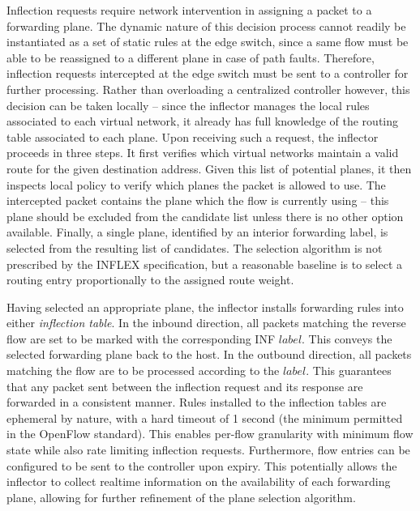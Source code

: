 Inflection requests require network intervention in assigning a packet to a forwarding plane.
The dynamic nature of this decision process cannot readily be instantiated as a set of static rules at the edge switch, since a same flow must be able to be reassigned to a different plane in case of path faults.
Therefore, inflection requests intercepted at the edge switch must be sent to a controller for further processing.
Rather than overloading a centralized controller however, this decision can be taken locally -- since the inflector manages the local rules associated to each virtual network, it already has full knowledge of the routing table associated to each plane.
Upon receiving such a request, the inflector proceeds in three steps.
It first verifies which virtual networks maintain a valid route for the given destination address.
Given this list of potential planes, it then inspects local policy to verify which planes the packet is allowed to use.
The intercepted packet contains the plane which the flow is currently using -- this plane should be excluded from the candidate list unless there is no other option available.
Finally, a single plane, identified by an interior forwarding label, is selected from the resulting list of candidates.
The selection algorithm is not prescribed by the INFLEX specification, but a reasonable baseline is to select a routing entry proportionally to the assigned route weight.

Having selected an appropriate plane, the inflector installs forwarding rules into either \emph{inflection table}.
In the inbound direction, all packets matching the reverse flow are set to be marked with the corresponding \ac{INF} $label$.
This conveys the selected forwarding plane back to the host.
In the outbound direction, all packets matching the flow are to be processed according to the $label$.
This guarantees that any packet sent between the inflection request and its response are forwarded in a consistent manner.
Rules installed to the inflection tables are ephemeral by nature, with a hard timeout of 1 second (the minimum permitted in the OpenFlow standard).
This enables per-flow granularity with minimum flow state while also rate limiting inflection requests.
Furthermore, flow entries can be configured to be sent to the controller upon expiry.
This potentially allows the inflector to collect realtime information on the availability of each forwarding plane, allowing for further refinement of the plane selection algorithm.
